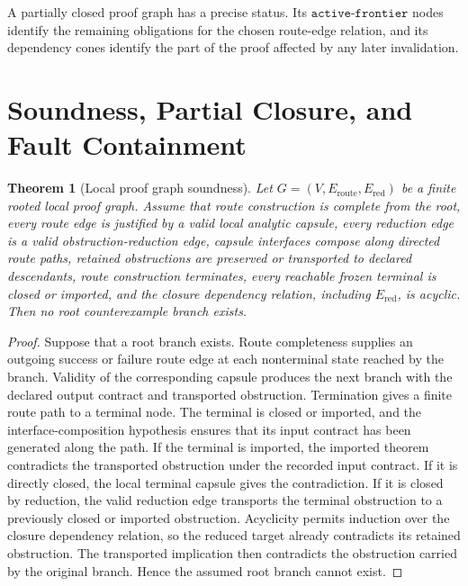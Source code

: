 \documentclass[11pt]{article}
\theoremstyle{plain}
\newtheorem{theorem}{Theorem}[section]
\theoremstyle{definition}
\theoremstyle{remark}
\begin{document}
A partially closed proof graph has a precise status.  Its \(\texttt{active-frontier}\) nodes
identify the remaining obligations for the chosen route-edge relation, and its
dependency cones identify the part of the proof affected by any later
invalidation.

\section{Soundness, Partial Closure, and Fault Containment}
\label{sec:soundness}

\begin{theorem}[Local proof graph soundness]
\label{thm:routed-proof-soundness}
Let \(G=(V,E_{\mathrm{route}},E_{\mathrm{red}})\) be a finite rooted local
proof graph.  Assume that route construction is complete from the root, every
route edge is justified by a valid local analytic capsule, every reduction edge
is a valid obstruction-reduction edge, capsule interfaces compose along
directed route paths, retained obstructions are preserved or transported to
declared descendants, route construction terminates, every reachable frozen
terminal is closed or imported, and the closure dependency relation, including
\(E_{\mathrm{red}}\), is acyclic.  Then no root counterexample branch exists.
\end{theorem}

\begin{proof}
Suppose that a root branch exists.  Route completeness supplies an outgoing
success or failure route edge at each nonterminal state reached by the branch.
Validity of the corresponding capsule produces the next branch with the
declared output contract and transported obstruction.  Termination gives a
finite route path to a terminal node.  The terminal is closed or imported, and
the interface-composition hypothesis ensures that its input contract has been
generated along the path.  If the terminal is imported, the imported theorem
contradicts the transported obstruction under the recorded input contract.  If
it is directly closed, the local terminal capsule gives the contradiction.  If
it is closed by reduction, the valid reduction edge transports the terminal
obstruction to a previously closed or imported obstruction.  Acyclicity permits
induction over the closure dependency relation, so the reduced target already
contradicts its retained obstruction.  The transported implication then
contradicts the obstruction carried by the original branch.  Hence the assumed
root branch cannot exist.
\end{proof}
\end{document}
